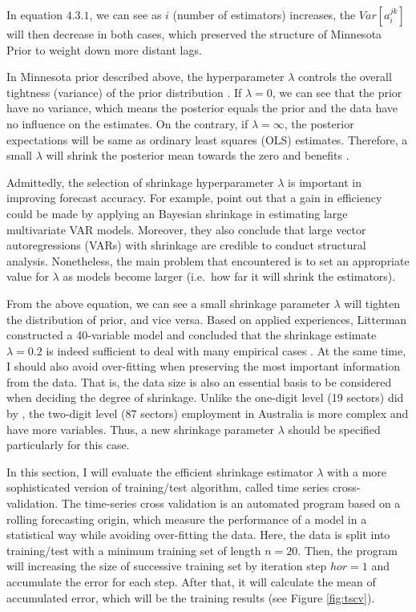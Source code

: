 \documentclass{monashthesis}
\begin{document}
In equation \(4.3.1\), we can see as \(i\) (number of estimators) increases, the \(Var[a_i^{jk}]\) will then decrease in both cases, which preserved the structure of Minnesota Prior to weight down more distant lags.

In Minnesota prior described above, the hyperparameter \(\lambda\) controls the overall tightness (variance) of the prior distribution \autocite{banbura2010}. If \(\lambda=0\), we can see that the prior have no variance, which means the posterior equals the prior and the data have no influence on the estimates. On the contrary, if \(\lambda=\infty\), the posterior expectations will be same as ordinary least squares (OLS) estimates. Therefore, a small \(\lambda\) will shrink the posterior mean towards the zero and benefits .

Admittedly, the selection of shrinkage hyperparameter \(\lambda\) is important in improving forecast accuracy. For example, \textcite{banbura2010large} point out that a gain in efficiency could be made by applying an Bayesian shrinkage in estimating large multivariate VAR models. Moreover, they also conclude that large vector autoregressions (VARs) with shrinkage are credible to conduct structural analysis. Nonetheless, the main problem that encountered is to set an appropriate value for \(\lambda\) as models become larger (i.e.~how far it will shrink the estimators).

From the above equation, we can see a small shrinkage parameter \(\lambda\) will tighten the distribution of prior, and vice versa. Based on applied experiences, Litterman constructed a 40-variable model and concluded that the shrinkage estimate \(\lambda=0.2\) is indeed sufficient to deal with many empirical cases \autocite{litterman1986}. At the same time, I should also avoid over-fitting when preserving the most important information from the data. That is, the data size is also an essential basis to be considered when deciding the degree of shrinkage\autocite{banbura2010large}. Unlike the one-digit level (19 sectors) did by \textcite{anderson2020}, the two-digit level (87 sectors) employment in Australia is more complex and have more variables. Thus, a new shrinkage parameter \(\lambda\) should be specified particularly for this case.

In this section, I will evaluate the efficient shrinkage estimator \(\lambda\) with a more sophisticated version of training/test algorithm, called time series cross-validation. The time-series cross validation is an automated program based on a rolling forecasting origin, which measure the performance of a model in a statistical way while avoiding over-fitting the data. Here, the data is split into training/test with a minimum training set of length \(n=20\). Then, the program will increasing the size of successive training set by iteration step \(hor=1\) and accumulate the error for each step. After that, it will calculate the mean of accumulated error, which will be the training results (see Figure \ref{fig:tscv}).
\end{document}
